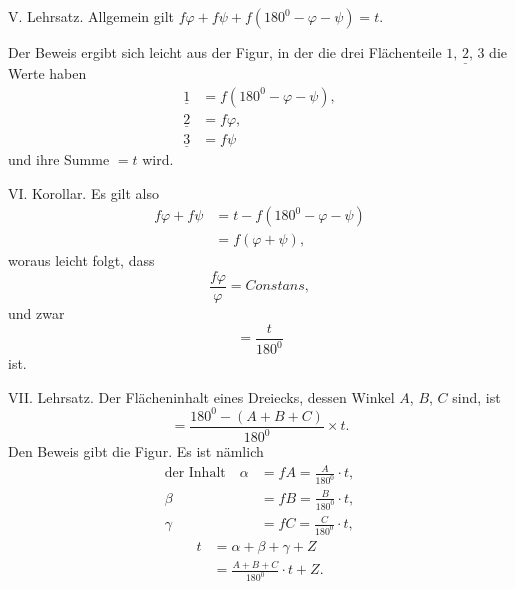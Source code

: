 %
V. Lehrsatz. Allgemein gilt $f\varphi+f\psi+f(180^{0}-\varphi-\psi)=t$.

Der Beweis ergibt sich leicht aus der Figur, in der die drei Flächenteile $\underline{1,\,2,\,3}$ die Werte haben
\[
\begin{aligned}
\underline{1}&=f(180^{0}-\varphi-\psi),\\
\underline{2}&=f\varphi,\\
\underline{3}&=f\psi
\end{aligned}
\]
und ihre Summe $=t$ wird.
\begin{center}\end{center}

VI. Korollar. Es gilt also
\[
\begin{aligned}
f\varphi+f\psi&=t-f(180^{0}-\varphi-\psi)\\
&=f(\varphi+\psi),
\end{aligned}
\]
woraus leicht folgt, dass
\[
\frac{f\varphi}{\varphi}=\mathit{Constans},
\]
und zwar
\[
=\frac{t}{180^{0}}
\]
ist.

VII. Lehrsatz. Der Flächeninhalt eines Dreiecks, dessen Winkel $A$, $B$, $C$ sind, ist
\[
=\frac{180^{0}-(A+B+C)}{180^{0}}\times t.
\]
Den Beweis gibt die Figur. Es ist nämlich
\[
\begin{aligned}
\text{der Inhalt}\quad\alpha&=fA=\frac{A}{180^{0}}\cdot t,\\
\beta&=fB=\frac{B}{180^{0}}\cdot t,\\
\gamma&=fC=\frac{C}{180^{0}}\cdot t,
\end{aligned}
\]
\[
\begin{aligned}
t&=\alpha+\beta+\gamma+Z\\
&=\frac{A+B+C}{180^{0}}\cdot t+Z.
\end{aligned}
\]
\begin{center}\end{center}

